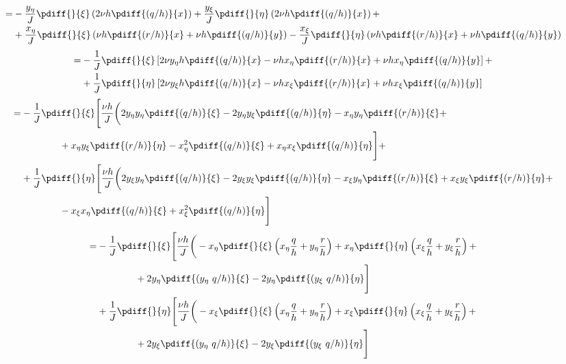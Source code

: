 	\begin{align}
		\begin{aligned}
			=&- \frac{y_{\eta}}{J} \pdiff{}{\xi}\left( 2\nu h\pdiff{(q/h)}{x} \right)
			+ \frac{y_{\xi}}{J} \pdiff{}{\eta}\left(2\nu h\pdiff{(q/h)}{x} \right) +
            \\
			&+ \frac{x_{\eta}}{J}\pdiff{}{\xi}\left(\nu h\pdiff{(r/h)}{x} + \nu h \pdiff{(q/h)}{y} \right)
			- \frac{x_{\xi}}{J} \pdiff{}{\eta}\left(\nu h\pdiff{(r/h)}{x} + \nu h \pdiff{(q/h)}{y} \right)
		\end{aligned}
	\end{align}
	\begin{align}
		\begin{aligned}
			=&- \frac{1}{J} \pdiff{}{\xi}\left[ 2\nu y_{\eta} h\pdiff{(q/h)}{x} - \nu h x_{\eta}\pdiff{(r/h)}{x} + \nu h x_{\eta} \pdiff{(q/h)}{y}\right] +
            \\
			& + \frac{1}{J} \pdiff{}{\eta}\left[ 2\nu y_{\xi} h\pdiff{(q/h)}{x} - \nu h x_{\xi} \pdiff{(r/h)}{x} + \nu h x_{\xi} \pdiff{(q/h)}{y}  \right]
		\end{aligned}
	\end{align}
	\begin{align}
		\begin{aligned}
			=&- \frac{1}{J} \pdiff{}{\xi}\Bigg[ \frac{\nu h}{J} \bigg(
			2 y_{\eta}  y_{\eta} \pdiff{(q/h)}{\xi}
			- 2 y_{\eta} y_{\xi} \pdiff{(q/h)}{\eta}
			- x_{\eta}y_{\eta} \pdiff{(r/h)}{\xi} +
            \\
			& \qquad \qquad + x_{\eta}y_{\xi} \pdiff{(r/h)}{\eta}
			- x_{\eta}^2\pdiff{(q/h)}{\xi}
			+ x_{\eta}x_{\xi}\pdiff{(q/h)}{\eta}\Bigg] + \\
			&+ \frac{1}{J} \pdiff{}{\eta}\Bigg[ \frac{\nu h}{J} \bigg(
			2 y_{\xi}y_{\eta} \pdiff{(q/h)}{\xi}
			- 2 y_{\xi}y_{\xi} \pdiff{(q/h)}{\eta}
			- x_{\xi}y_{\eta} \pdiff{(r/h)}{\xi}
			+ x_{\xi}y_{\xi} \pdiff{(r/h)}{\eta} +
            \\
			& \qquad \qquad - x_{\xi} x_{\eta} \pdiff{(q/h)}{\xi}
			+ x_{\xi}^2 \pdiff{(q/h)}{\eta}   \Bigg]\\
		\end{aligned}
	\end{align}
%
	\begin{align}
		\begin{aligned}
			=&- \frac{1}{J} \pdiff{}{\xi}\Bigg[ \frac{\nu h}{J} \bigg(
			- x_{\eta} \pdiff{}{\xi}\left( x_{\eta}\frac{q}{h} + y_{\eta}\frac{r}{h}  \right)
			+ x_{\eta} \pdiff{}{\eta}\left( x_{\xi} \frac{q}{h} + y_{\xi} \frac{r}{h}  \right) +
            \\
			& \qquad \qquad + 2 y_{\eta}  \pdiff{(y_{\eta}\ q/h)}{\xi}
			- 2 y_{\eta}  \pdiff{(y_{\xi}\ q/h)}{\eta} \Bigg]\\
			&+ \frac{1}{J} \pdiff{}{\eta}\Bigg[ \frac{\nu h}{J} \bigg(
			- x_{\xi} \pdiff{}{\xi}\left( x_{\eta}\frac{q}{h} + y_{\eta}\frac{r}{h}  \right)
			+ x_{\xi} \pdiff{}{\eta}\left( x_{\xi} \frac{q}{h} + y_{\xi} \frac{r}{h}  \right) +
            \\
			& \qquad \qquad + 2 y_{\xi} \pdiff{(y_{\eta}\ q/h)}{\xi}
			- 2 y_{\xi} \pdiff{(y_{\xi}\ q/h)}{\eta} \Bigg]\\
		\end{aligned}
	\end{align}
